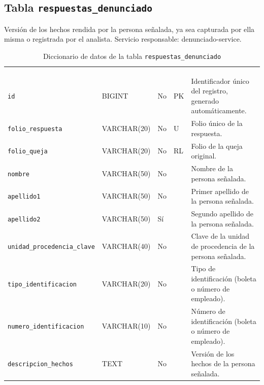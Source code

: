 \subsection{Tabla \texttt{respuestas\_denunciado}}
Versión de los hechos rendida por la persona señalada, ya sea capturada por ella misma o registrada por el analista. Servicio responsable: denunciado-service.


\footnotesize
\renewcommand{\arraystretch}{1.15}
\setlength{\tabcolsep}{4pt}
\begin{longtable}{|L{3.9cm}|L{2.4cm}|L{0.9cm}|L{1.2cm}|L{6.6cm}|}
	\hiderowcolors\caption{Diccionario de datos de la tabla \texttt{respuestas\_denunciado}}
	\label{tab:dic_respuestas_denunciado} \\ \showrowcolors
	\hline
	 &  &  &  &  \\
	\hline
	\endfirsthead
	\hline
	 &  &  &  &  \\
	\hline
	\endhead
		\texttt{id} & BIGINT & No & PK & Identificador único del registro, generado automáticamente. \\ \hline
		\texttt{folio\_\allowbreak{}respuesta} & VARCHAR(20) & No & U & Folio único de la respuesta. \\ \hline
		\texttt{folio\_\allowbreak{}queja} & VARCHAR(20) & No & RL & Folio de la queja original. \\ \hline
		\texttt{nombre} & VARCHAR(50) & No &  & Nombre de la persona señalada. \\ \hline
		\texttt{apellido1} & VARCHAR(50) & No &  & Primer apellido de la persona señalada. \\ \hline
		\texttt{apellido2} & VARCHAR(50) & Sí &  & Segundo apellido de la persona señalada. \\ \hline
		\texttt{unidad\_\allowbreak{}procedencia\_\allowbreak{}clave} & VARCHAR(40) & No &  & Clave de la unidad de procedencia de la persona señalada. \\ \hline
		\texttt{tipo\_\allowbreak{}identificacion} & VARCHAR(20) & No &  & Tipo de identificación (boleta o número de empleado). \\ \hline
		\texttt{numero\_\allowbreak{}identificacion} & VARCHAR(10) & No &  & Número de identificación (boleta o número de empleado). \\ \hline
		\texttt{descripcion\_\allowbreak{}hechos} & TEXT & No &  & Versión de los hechos de la persona señalada. \\ \hline

\end{longtable}

